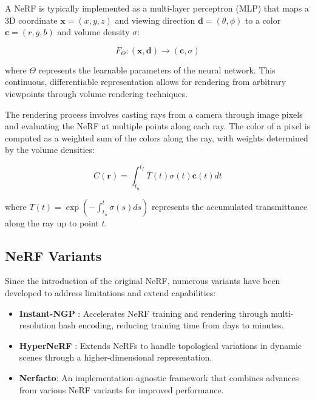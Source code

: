 A NeRF is typically implemented as a multi-layer perceptron (MLP) that maps a 3D coordinate $\mathbf{x} = (x, y, z)$ and viewing direction $\mathbf{d} = (\theta, \phi)$ to a color $\mathbf{c} = (r, g, b)$ and volume density $\sigma$:

\begin{equation}
    F_\Theta: (\mathbf{x}, \mathbf{d}) \rightarrow (\mathbf{c}, \sigma)
\end{equation}

where $\Theta$ represents the learnable parameters of the neural network. This continuous, differentiable representation allows for rendering from arbitrary viewpoints through volume rendering techniques.

The rendering process involves casting rays from a camera through image pixels and evaluating the NeRF at multiple points along each ray. The color of a pixel is computed as a weighted sum of the colors along the ray, with weights determined by the volume densities:

\begin{equation}
    C(\mathbf{r}) = \int_{t_n}^{t_f} T(t) \sigma(t) \mathbf{c}(t) dt
\end{equation}

where $T(t) = \exp\left(-\int_{t_n}^{t} \sigma(s) ds\right)$ represents the accumulated transmittance along the ray up to point $t$.

\subsection{NeRF Variants}

Since the introduction of the original NeRF, numerous variants have been developed to address limitations and extend capabilities:

\begin{itemize}
    \item \textbf{Instant-NGP} \parencite{muller2022instant}: Accelerates NeRF training and rendering through multi-resolution hash encoding, reducing training time from days to minutes.
    
    \item \textbf{HyperNeRF} \parencite{wang2023hypernerf}: Extends NeRFs to handle topological variations in dynamic scenes through a higher-dimensional representation.
    
    \item \textbf{Nerfacto}: An implementation-agnostic framework that combines advances from various NeRF variants for improved performance.
\end{itemize}

